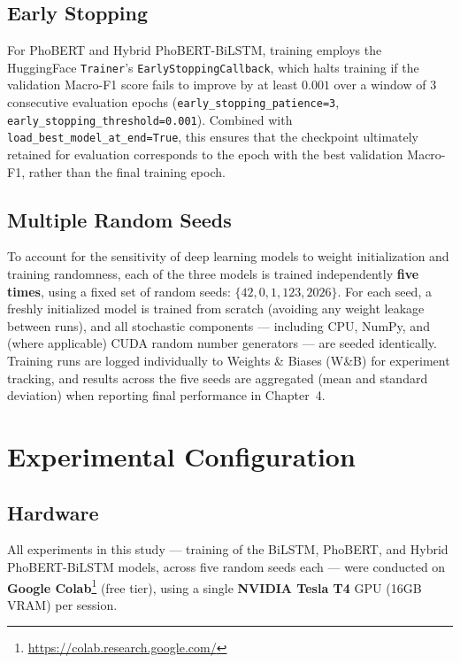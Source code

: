 \documentclass[12pt]{report} %
\begin{document}
\subsection{Early Stopping}
For PhoBERT and Hybrid PhoBERT-BiLSTM, training employs the HuggingFace \texttt{Trainer}'s \cite{wolf2020transformers} \texttt{EarlyStoppingCallback}, which halts training if the validation Macro-F1 score fails to improve by at least $0.001$ over a window of 3 consecutive evaluation epochs (\texttt{early\_stopping\_patience=3}, \texttt{early\_stopping\_threshold=0.001}). Combined with \texttt{load\_best\_model\_at\_end=True}, this ensures that the checkpoint ultimately retained for evaluation corresponds to the epoch with the best validation Macro-F1, rather than the final training epoch.

\subsection{Multiple Random Seeds}
To account for the sensitivity of deep learning models to weight initialization and training randomness, each of the three models is trained independently \textbf{five times}, using a fixed set of random seeds: $\{42, 0, 1, 123, 2026\}$. For each seed, a freshly initialized model is trained from scratch (avoiding any weight leakage between runs), and all stochastic components --- including CPU, NumPy, and (where applicable) CUDA random number generators --- are seeded identically. Training runs are logged individually to Weights \& Biases (W\&B) \cite{wandb} for experiment tracking, and results across the five seeds are aggregated (mean and standard deviation) when reporting final performance in Chapter~4.

\section{Experimental Configuration}

\subsection{Hardware}
All experiments in this study --- training of the BiLSTM, PhoBERT, and Hybrid PhoBERT-BiLSTM models, across five random seeds each --- were conducted on \textbf{Google Colab}\footnote{\url{https://colab.research.google.com/}} (free tier), using a single \textbf{NVIDIA Tesla T4} GPU (16GB VRAM) per session.
\end{document}
